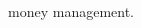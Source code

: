 \documentclass[theme]{cv_einstein}
\begin{document}
\begin{paracol}{2}
\begin{rightcolumn}
{money management.}
            \end{rightcolumn}
            \begin{rightcolumn}\noindent \small
        \end{rightcolumn}
        \vspace{0em}
    \end{paracol}
\end{document}
